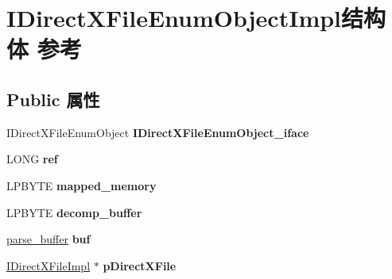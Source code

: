 \hypertarget{struct_i_direct_x_file_enum_object_impl}{}\section{I\+Direct\+X\+File\+Enum\+Object\+Impl结构体 参考}
\label{struct_i_direct_x_file_enum_object_impl}
\subsection*{Public 属性}
\begin{DoxyCompactItemize}
\item 
\mbox{\label{struct_i_direct_x_file_enum_object_impl_a38b903e825e790938b30d13b9e2905ac}} 
I\+Direct\+X\+File\+Enum\+Object {\bfseries I\+Direct\+X\+File\+Enum\+Object\+\_\+iface}
\item 
\mbox{\label{struct_i_direct_x_file_enum_object_impl_a2b11edd3d8c564b3db2ed636081a0745}} 
L\+O\+NG {\bfseries ref}
\item 
\mbox{\label{struct_i_direct_x_file_enum_object_impl_a35b2b35ee8d4a5a5b773fa9dce6c91a3}} 
L\+P\+B\+Y\+TE {\bfseries mapped\+\_\+memory}
\item 
\mbox{\label{struct_i_direct_x_file_enum_object_impl_a9bdd2f71d30808540378399dbca79469}} 
L\+P\+B\+Y\+TE {\bfseries decomp\+\_\+buffer}
\item 
\mbox{\label{struct_i_direct_x_file_enum_object_impl_ab5a65cd0f289667be95b8b77f33b2363}} 
\hyperlink{structparse__buffer}{parse\+\_\+buffer} {\bfseries buf}
\item 
\mbox{\label{struct_i_direct_x_file_enum_object_impl_a5affdcd67d2f7989ecac44a1bda62180}} 
\hyperlink{struct_i_direct_x_file_impl}{I\+Direct\+X\+File\+Impl} $\ast$ {\bfseries p\+Direct\+X\+File}
\item 
\mbox{\label{struct_i_direct_x_file_enum_object_impl_a75f35e93659b78efea0715f33e3b3b15}} 

\end{DoxyCompactItemize}
